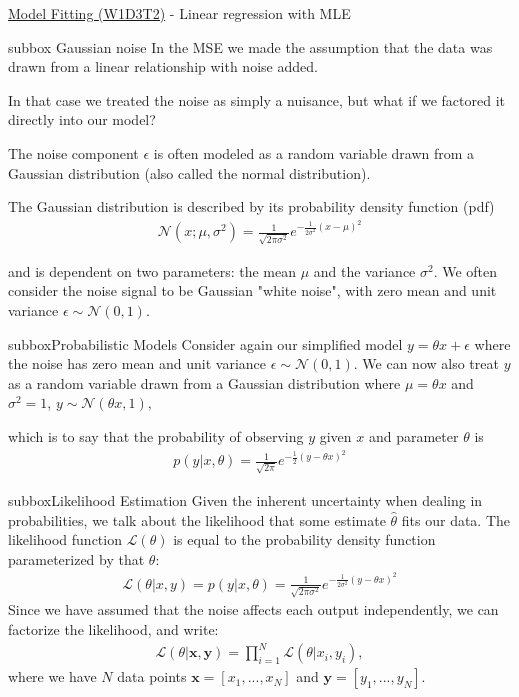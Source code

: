 \begin{textbox}{\href{https://compneuro.neuromatch.io/tutorials/W1D3_ModelFitting/student/W1D3_Tutorial2.html}{Model Fitting (W1D3T2)} -  Linear regression with MLE}
\begin{subbox}{subbox}{ Gaussian noise}
\scriptsize
In the MSE we made the assumption that the data was drawn from a linear relationship with noise added.

In that case we treated the noise as simply a nuisance, but what if we factored it directly into our model?

The noise component $\epsilon$ is often modeled as a random variable drawn from a Gaussian distribution (also called the normal distribution).

The Gaussian distribution is described by its probability density function (pdf)
\begin{align}
\mathcal{N}(x; \mu, \sigma^2) = \frac{1}{\sqrt{2\pi\sigma^2}}e^{-\frac{1}{2\sigma^2}(x-\mu)^2}
\end{align}

and is dependent on two parameters: the mean $\mu$ and the variance $\sigma^2$. We often consider the noise signal to be Gaussian "white noise", with zero mean and unit variance
$\epsilon \sim \mathcal{N}(0, 1).
$

\end{subbox}
\begin{subbox}{subbox}{Probabilistic Models}
\scriptsize
Consider again our simplified model $y = \theta x + \epsilon$ where the noise has zero mean and unit variance $\epsilon \sim \mathcal{N}(0, 1)$. We can now also treat $y$ as a random variable drawn from a Gaussian distribution where $\mu = \theta x$ and $\sigma^2 = 1$, 
$y \sim \mathcal{N}(\theta x, 1),
$

which is to say that the probability of observing $y$ given $x$ and parameter $\theta$ is
\begin{align}
p(y|x,\theta) = \frac{1}{\sqrt{2\pi}}e^{-\frac{1}{2}(y-\theta x)^2}
\end{align}

\end{subbox}

\begin{subbox}{subbox}{Likelihood Estimation}
\scriptsize
 Given the inherent uncertainty when dealing in probabilities, we talk about the likelihood that some estimate $\hat{\theta}$ fits our data. The likelihood function $\mathcal{L}(\theta)$ is equal to the probability density function parameterized by that $\theta$:
\begin{align}
\mathcal{L}(\theta|x,y) = p(y|x,\theta) = \frac{1}{\sqrt{2\pi\sigma^2}}e^{-\frac{1}{2\sigma^2}(y-\theta x)^2}
\end{align}
Since we have assumed that the noise affects each output independently, we can factorize the likelihood, and write:
\begin{align}
\mathcal{L}(\theta|\mathbf{x}, \mathbf{y}) = \prod_{i=1}^N \mathcal{L}(\theta|x_i,y_i),
\end{align}
where we have $N$ data points $\mathbf{x} = [x_1,...,x_N]$ and $\mathbf{y} = [y_1,...,y_N]$.
\end{subbox}
\end{textbox}
